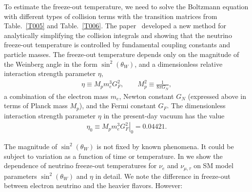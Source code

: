 To estimate the freeze-out temperature, we need to solve the Boltzmann equation with different types of collision terms with the transition matrices from Table.~\ref{T005} and Table.~\ref{T006}. The paper~\cite{Birrell:2014uka} developed a new method for analytically simplifying the collision integrals and showing that the neutrino freeze-out temperature is controlled by fundamental coupling constants and particle masses. The freeze-out temperature depends only on the magnitude of the Weinberg angle in the form $\sin^2(\theta_W)$, and a dimensionless relative interaction strength parameter $\eta$,
\begin{align}
\eta\equiv M_p m_e^3 G_F^2, \qquad M_p^2\equiv \frac{1}{8\pi G_N}, \end{align}
a combination of the electron mass $m_e$, Newton constant $G_N$ (expressed above in terms of Planck mass $M_p$), and the Fermi constant $G_F$. The dimensionless interaction strength parameter $\eta$ in the present-day vacuum has the value
\begin{align}
\eta_0\equiv \left.M_p m_e^3 G_F^2\right|_0 = 0.04421 .
\end{align}

The magnitude of $\sin^2(\theta_W)$ is not fixed by known phenomena. It could be subject to variation as a function of time or temperature. In  we show the dependence of neutrino freeze-out temperatures for $\nu_e$ and $\nu_{\mu,\tau}$ on SM model parameters $\sin^2(\theta_W)$ and $\eta$ in detail. We note the difference in freeze-out between electron neutrino and the heavier flavors. However:

